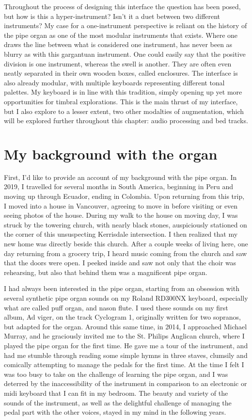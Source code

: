 \documentclass[12pt,twoside,maitrise]{dms}
\theoremstyle{definition}
\begin{document}
Throughout the process of designing this interface the question has been posed, but how is this a hyper-instrument?
Isn't it a duet between two different instruments?
My case for a one-instrument perspective is reliant on the history of the pipe organ as one of the most modular instruments that exists.
Where one draws the line between what is considered one instrument, has never been as blurry as with this gargantuan instrument.
One could easily say that the positive division is one instrument, whereas the swell is another.
They are often even neatly separated in their own wooden boxes, called enclosures.
The interface is also already modular, with multiple keyboards representing different tonal palettes.
My keyboard is in line with this tradition, simply opening up yet more opportunities for timbral explorations.
This is the main thrust of my interface, but I also explore to a lesser extent, two other modalties of augmentation, which will be explored further throughout this chapter: audio processing and bed tracks.

\section{My background with the organ}
First, I’d like to provide an account of my background with the pipe organ.
In 2019, I travelled for several months in South America, beginning in Peru and moving up through Ecuador, ending in Colombia.
Upon returning from this trip, I moved into a house in Vancouver, agreeing to move in before visiting or even seeing photos of the house.
During my walk to the house on moving day, I was struck by the towering church, with nearly black stones, auspiciously stationed on the corner of this unsuspecting Kerrisdale intersection.
I then realized that my new home was directly beside this church.
After a couple weeks of living here, one day returning from a grocery trip, I heard music coming from the church and saw that the doors were open.
I peeked inside and saw not only that the choir was rehearsing, but also that behind them was a magnificent pipe organ.


I had always been interested in the pipe organ, starting from an obsession with several synthetic pipe organ sounds on my Roland RD300NX keyboard, especially what are called puff organ, and nason flute.
I used these sounds on my first album, Ad viger, on the track Cyclogram 1, originally written for two sopranos, but adapted for the organ.
Around this same time, in 2014, I approached Michael Murray, and he graciously invited me to the St.
Philips Anglican church, where I played the pipe organ for the first time.
He gave me a tour of the instrument, and had me stumble through reading some simple hymns in three staves, clumsily and comically attempting to manage the pedals for the first time.
At the time I felt I was too busy to take on the challenge of learning the pipe organ, and I was deterred by the inaccessibility of the instrument in comparison to an electronic or midi keyboard that I can fit in my bedroom.
The beauty and variety of the sounds of the instrument, as well as the delightful challenge of managing the pedal part with the other voices,  stayed in my mind in the following years.
\end{document}
